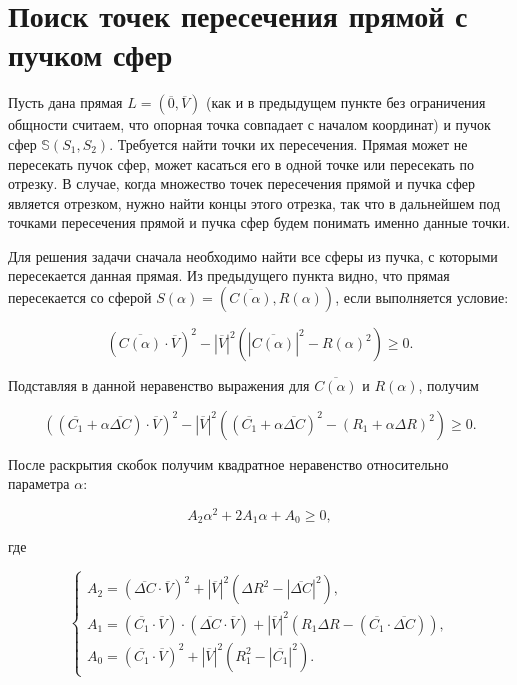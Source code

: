 \documentclass[a4paper,10pt]{extarticle}                     %
\numberwithin{equation}{section}                             %
\numberwithin{figure}{section}                               %
\theoremstyle{plain}                                         %
\begin{document}
\section{Поиск точек пересечения прямой с пучком сфер}

Пусть дана прямая $L = (\overline{0}, \overline{V})$ (как и в предыдущем пункте без ограничения общности считаем, что опорная точка совпадает с началом координат) и пучок сфер $\mathbb{S}(S_1, S_2)$.
Требуется найти точки их пересечения.
Прямая может не пересекать пучок сфер, может касаться его в одной точке или пересекать по отрезку.
В случае, когда множество точек пересечения прямой и пучка сфер является отрезком, нужно найти концы этого отрезка, так что в дальнейшем под точками пересечения прямой и пучка сфер будем понимать именно данные точки.

Для решения задачи сначала необходимо найти все сферы из пучка, с которыми пересекается данная прямая.
Из предыдущего пункта видно, что прямая пересекается со сферой $S(\alpha) = (\overline{C(\alpha)}, R(\alpha))$, если выполняется условие:

\begin{equation}
    (\overline{C(\alpha)}\cdot\overline{V})^2 - {|\overline{V}|}^2({|\overline{C(\alpha)}|}^2 - R(\alpha)^2) \ge 0.
\end{equation}

Подставляя в данной неравенство выражения для $\overline{C(\alpha)}$ и $R(\alpha)$, получим

\begin{equation}
    \left((\overline{C_1} + \alpha\overline{\Delta C})\cdot\overline{V}\right)^2 - {|\overline{V}|}^2\left((\overline{C_1} + \alpha\overline{\Delta C})^2 - (R_1 + \alpha \Delta R)^2\right) \ge 0.
\end{equation}

После раскрытия скобок получим квадратное неравенство относительно параметра $\alpha$:

\begin{equation}
    A_2 \alpha^2 + 2A_1 \alpha + A_0 \ge 0,
\end{equation}

где

\begin{equation}
    \begin{cases}
        A_2 = (\overline{\Delta C}\cdot\overline{V})^2 + |\overline{V}|^2({\Delta R}^2 - |\overline{\Delta C}|^2), \\
        A_1 = (\overline{C_1}\cdot\overline{V})\cdot(\overline{\Delta C}\cdot\overline{V}) + |\overline{V}|^2(R_1\Delta R - (\overline{C_1}\cdot\overline{\Delta C})), \\
        A_0 = (\overline{C_1}\cdot\overline{V})^2 + |\overline{V}|^2(R_1^2 - |\overline{C_1}|^2).
    \end{cases}
\end{equation}
\end{document}
